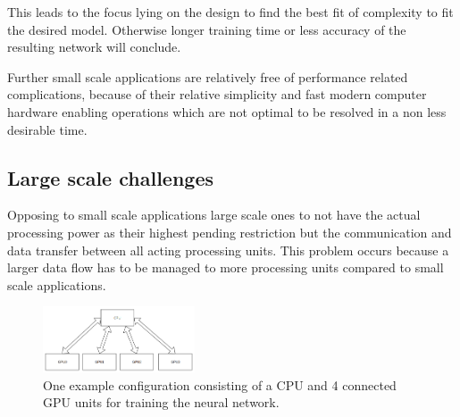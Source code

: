 \documentclass[conference]{IEEEtran}
\begin{document}
This leads to the focus lying on the design to find the best fit of complexity to fit the desired model. Otherwise longer training time or less accuracy of the resulting network will conclude.

Further small scale applications are relatively free of performance related complications, because of their relative simplicity and fast modern computer hardware enabling operations which are not optimal to be resolved in a non less desirable time.

\subsection{Large scale challenges}
Opposing to small scale applications large scale ones to not have the actual processing power as their highest pending restriction but the communication and data transfer between all acting processing units. This problem occurs because a larger data flow has to be managed to more processing units compared to small scale applications.

\begin{figure}
\centering
\includegraphics[width=0.4\textwidth]{example_configuration.png}
\caption{One example configuration consisting of a CPU and 4 connected GPU units for training the neural network.}
\end{figure}
\end{document}
